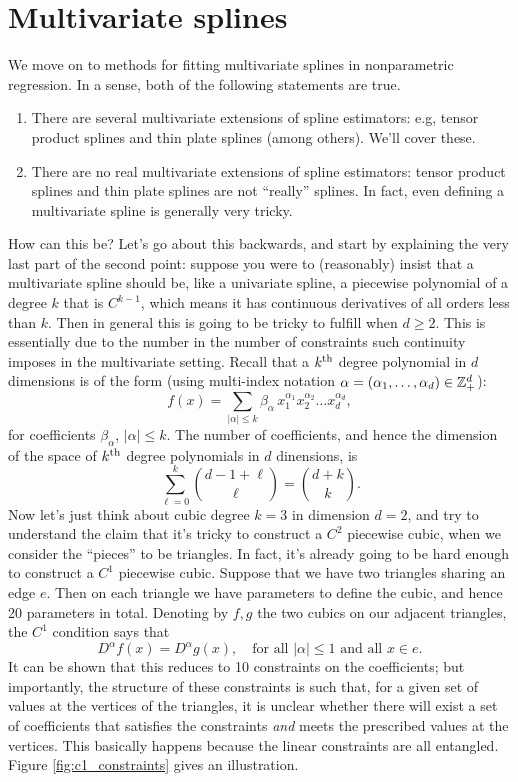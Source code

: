 \documentclass{article}
\begin{document}
\section{Multivariate splines}

We move on to methods for fitting multivariate splines in nonparametric
regression. In a sense, both of the following statements are true. 

\begin{enumerate}
\item There are several multivariate extensions of spline estimators: e.g,
  tensor product splines and thin plate splines (among others). We'll cover
  these. 
\item There are no real multivariate extensions of spline estimators: tensor
  product splines and thin plate splines are not ``really'' splines. In fact,
  even defining a multivariate spline is generally very tricky. 
\end{enumerate}

How can this be? Let's go about this backwards, and start by explaining the very
last part of the second point: suppose you were to (reasonably) insist that a 
multivariate spline should be, like a univariate spline, a piecewise polynomial
of a degree $k$ that is $C^{k-1}$, which means it has continuous derivatives of
all orders less than $k$. Then in general this is going to be tricky to fulfill
when $d \geq 2$. This is essentially due to the number in the number of
constraints such continuity imposes in the multivariate setting. Recall that a
$k^{\text{th}}$ degree polynomial in $d$ dimensions is of the form (using multi-index
notation $\alpha = (\alpha_1,\dots,\alpha_d) \in \mathbb{Z}^d_+$):
\begin{equation}
\label{eq:polynomial}
f(x) = \sum_{|\alpha| \leq k} \beta_\alpha \, x_1^{\alpha_1} x_2^{\alpha_2}
\dots x_d^{\alpha_d},
\end{equation}
for coefficients $\beta_\alpha$, $|\alpha| \leq k$. The number of coefficients,
and hence the dimension of the space of $k^{\text{th}}$ degree polynomials in $d$
dinensions, is
\[
\sum_{\ell=0}^k {d-1+\ell \choose \ell} = {d + k \choose k}.
\]
Now let's just think about cubic degree $k=3$ in dimension $d=2$, and try to  
understand the claim that it's tricky to construct a $C^2$ piecewise cubic,
when we consider the ``pieces'' to be triangles. In fact, it's already going to
be hard enough to construct a $C^1$ piecewise cubic. Suppose that we have two  
triangles sharing an edge $e$. Then on each triangle we have  parameters to define the cubic, and hence 20 parameters in
total. Denoting by $f,g$ the two cubics on our adjacent triangles, the $C^1$ 
condition says that
\[
D^\alpha f(x) = D^\alpha g(x), \quad \text{for all $|\alpha| \leq 1$ and all $x
  \in e$}. 
\] 
It can be shown that this reduces to 10 constraints on the coefficients; but
importantly, the structure of these constraints is such that, for a given set of
values at the vertices of the triangles, it is unclear whether there will exist
a set of coefficients that satisfies the constraints \emph{and} meets the
prescribed values at the vertices. This basically happens because the linear 
constraints are all entangled. Figure \ref{fig:c1_constraints} gives an
illustration.    
\end{document}
